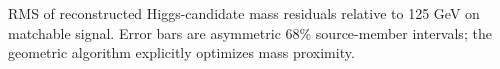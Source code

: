 RMS of reconstructed Higgs-candidate mass residuals relative to 125 GeV on matchable signal. Error bars are asymmetric 68\% source-member intervals; the geometric algorithm explicitly optimizes mass proximity.
